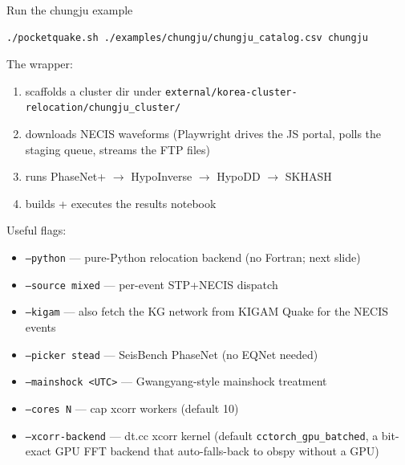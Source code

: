 \documentclass[10pt,aspectratio=169]{beamer}
\begin{document}
\begin{frame}{Run the chungju example}
\begin{lstlisting}[language=bash]
./pocketquake.sh ./examples/chungju/chungju_catalog.csv chungju
\end{lstlisting}
\smallskip
The wrapper:
\begin{enumerate}
  \item scaffolds a cluster dir under
        \texttt{external/korea-cluster-relocation/chungju\_cluster/}
  \item downloads NECIS waveforms (Playwright drives the JS portal,
        polls the staging queue, streams the FTP files)
  \item runs PhaseNet+ $\to$ HypoInverse $\to$ HypoDD $\to$ SKHASH
  \item builds + executes the results notebook
\end{enumerate}
\smallskip
Useful flags:
\begin{itemize}
  \item \texttt{--python} --- pure-Python relocation backend (no Fortran; next slide)
  \item \texttt{--source mixed} --- per-event STP+NECIS dispatch
  \item \texttt{--kigam} --- also fetch the KG network from KIGAM Quake for the NECIS events
  \item \texttt{--picker stead} --- SeisBench PhaseNet (no EQNet needed)
  \item \texttt{--mainshock <UTC>} --- Gwangyang-style mainshock treatment
  \item \texttt{--cores N} --- cap xcorr workers (default 10)
  \item \texttt{--xcorr-backend} --- dt.cc xcorr kernel (default \texttt{cctorch\_gpu\_batched}, a bit-exact GPU FFT backend that auto-falls-back to obspy without a GPU)
\end{itemize}
\end{frame}
\end{document}
